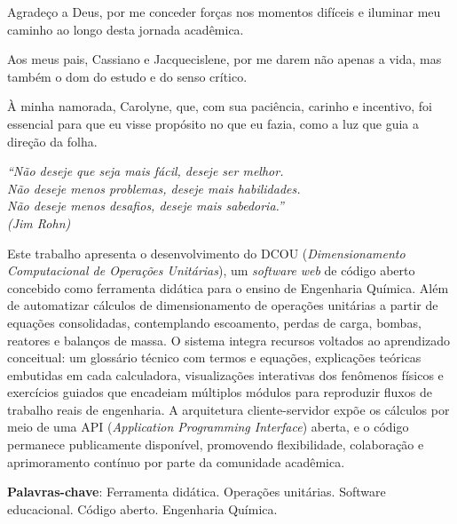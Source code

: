 \documentclass[
	12pt,				%
	openright,			%
	twoside,			%
	a4paper,			%
	english,			%
	brazil				%
	]{abntex2}
\begin{document}

\begin{agradecimentos}
Agradeço a Deus, por me conceder forças nos momentos difíceis e iluminar meu caminho ao longo desta jornada acadêmica.

Aos meus pais, Cassiano e Jacquecislene, por me darem não apenas a vida, mas também o dom do estudo e do senso crítico.

À minha namorada, Carolyne, que, com sua paciência, carinho e incentivo, foi essencial para que eu visse propósito no que eu fazia, como a luz que guia a direção da folha.
\end{agradecimentos}

\begin{epigrafe}
    \vspace*{\fill}
	\begin{flushright}
		\textit{``Não deseje que seja mais fácil, deseje ser melhor.\\
		Não deseje menos problemas, deseje mais habilidades.\\
		Não deseje menos desafios, deseje mais sabedoria.''\\
		(Jim Rohn)}
	\end{flushright}
\end{epigrafe}


\setlength{\absparsep}{18pt} %
\begin{resumo}
Este trabalho apresenta o desenvolvimento do DCOU (\textit{Dimensionamento Computacional de Operações Unitárias}), um \textit{software} \textit{web} de código aberto concebido como ferramenta didática para o ensino de Engenharia Química. Além de automatizar cálculos de dimensionamento de operações unitárias a partir de equações consolidadas, contemplando escoamento, perdas de carga, bombas, reatores e balanços de massa. O sistema integra recursos voltados ao aprendizado conceitual: um glossário técnico com termos e equações, explicações teóricas embutidas em cada calculadora, visualizações interativas dos fenômenos físicos e exercícios guiados que encadeiam múltiplos módulos para reproduzir fluxos de trabalho reais de engenharia. A arquitetura cliente-servidor expõe os cálculos por meio de uma API (\textit{Application Programming Interface}) aberta, e o código permanece publicamente disponível, promovendo flexibilidade, colaboração e aprimoramento contínuo por parte da comunidade acadêmica.

 \textbf{Palavras-chave}: Ferramenta didática. Operações unitárias. Software educacional. Código aberto. Engenharia Química.
\end{resumo}
\end{document}
